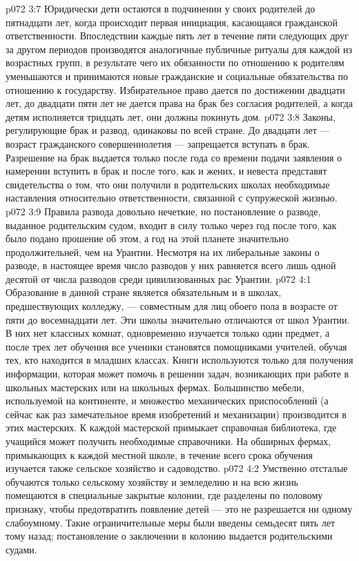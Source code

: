 \vs p072 3:7 \pc Юридически дети остаются в подчинении у своих родителей до пятнадцати лет, когда происходит первая инициация, касающаяся гражданской ответственности. Впоследствии каждые пять лет в течение пяти следующих друг за другом периодов производятся аналогичные публичные ритуалы для каждой из возрастных групп, в результате чего их обязанности по отношению к родителям уменьшаются и принимаются новые гражданские и социальные обязательства по отношению к государству. Избирательное право дается по достижении двадцати лет, до двадцати пяти лет не дается права на брак без согласия родителей, а когда детям исполняется тридцать лет, они должны покинуть дом.
\vs p072 3:8 Законы, регулирующие брак и развод, одинаковы по всей стране. До двадцати лет --- возраст гражданского совершеннолетия --- запрещается вступать в брак. Разрешение на брак выдается только после года со времени подачи заявления о намерении вступить в брак и после того, как и жених, и невеста представят свидетельства о том, что они получили в родительских школах необходимые наставления относительно ответственности, связанной с супружеской жизнью.
\vs p072 3:9 Правила развода довольно нечеткие, но постановление о разводе, выданное родительским судом, входит в силу только через год после того, как было подано прошение об этом, а год на этой планете значительно продолжительней, чем на Урантии. Несмотря на их либеральные законы о разводе, в настоящее время число разводов у них равняется всего лишь одной десятой от числа разводов среди цивилизованных рас Урантии.
\vs p072 4:1 Образование в данной стране является обязательным и в школах, предшествующих колледжу, --- совместным для лиц обоего пола в возрасте от пяти до восемнадцати лет. Эти школы значительно отличаются от школ Урантии. В них нет классных комнат, одновременно изучается только один предмет, а после трех лет обучения все ученики становятся помощниками учителей, обучая тех, кто находится в младших классах. Книги используются только для получения информации, которая может помочь в решении задач, возникающих при работе в школьных мастерских или на школьных фермах. Большинство мебели, используемой на континенте, и множество механических приспособлений (а сейчас как раз замечательное время изобретений и механизации) производится в этих мастерских. К каждой мастерской примыкает справочная библиотека, где учащийся может получить необходимые справочники. На обширных фермах, примыкающих к каждой местной школе, в течение всего срока обучения изучается также сельское хозяйство и садоводство.
\vs p072 4:2 \pc Умственно отсталые обучаются только сельскому хозяйству и земледелию и на всю жизнь помещаются в специальные закрытые колонии, где разделены по половому признаку, чтобы предотвратить появление детей --- это не разрешается ни одному слабоумному. Такие ограничительные меры были введены семьдесят пять лет тому назад; постановление о заключении в колонию выдается родительскими судами.
